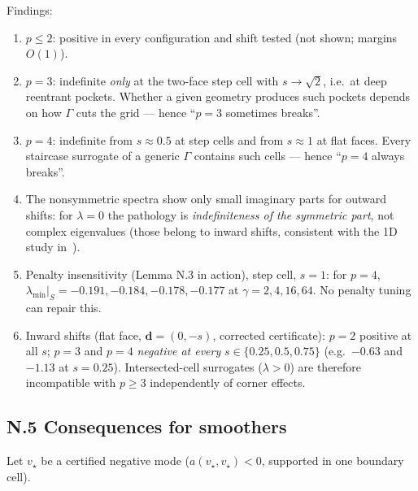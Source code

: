 Findings:
\begin{enumerate}
  \item[(i)] $p \le 2$: positive in every configuration and shift tested
        (not shown; margins $O(1)$).
  \item[(ii)] $p=3$: indefinite \emph{only} at the two-face step cell with
        $s \to \sqrt2$, i.e.\ at deep reentrant pockets. Whether a given
        geometry produces such pockets depends on how $\Gamma$ cuts the
        grid --- hence ``$p=3$ sometimes breaks''.
  \item[(iii)] $p=4$: indefinite from $s \approx 0.5$ at step cells and
        from $s \approx 1$ at flat faces. Every staircase surrogate of a
        generic $\Gamma$ contains such cells --- hence ``$p=4$ always
        breaks''.
  \item[(iv)] The nonsymmetric spectra show only small imaginary parts for
        outward shifts: for $\lambda = 0$ the pathology is
        \emph{indefiniteness of the symmetric part}, not complex
        eigenvalues (those belong to inward shifts, consistent with the 1D
        study in~\cite{wichrowski2025geometric}).
  \item[(v)] Penalty insensitivity (Lemma N.3 in action), step cell,
        $s=1$: for $p=4$, $\lambda_{\min}|_S = -0.191, -0.184, -0.178,
        -0.177$ at $\gamma = 2, 4, 16, 64$. No penalty tuning can repair
        this.
  \item[(vi)] Inward shifts (flat face, $\mathbf d = (0,-s)$, corrected
        certificate): $p=2$ positive at all $s$; $p=3$ and $p=4$
        \emph{negative at every} $s \in \{0.25, 0.5, 0.75\}$ (e.g.\ $-0.63$
        and $-1.13$ at $s=0.25$). Intersected-cell surrogates
        ($\lambda>0$) are therefore incompatible with $p \ge 3$
        independently of corner effects.
\end{enumerate}

\subsection*{N.5 Consequences for smoothers}

Let $v_\star$ be a certified negative mode ($a(v_\star,v_\star) < 0$,
supported in one boundary cell).

